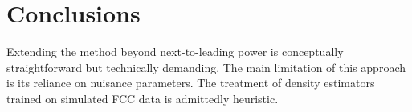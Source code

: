 \section{Conclusions}\label{sec:conclusions}

Extending the method beyond next-to-leading power is conceptually
straightforward but technically demanding. The main limitation of this
approach is its reliance on nuisance parameters. The treatment of
density estimators trained on simulated FCC data is admittedly
heuristic.

